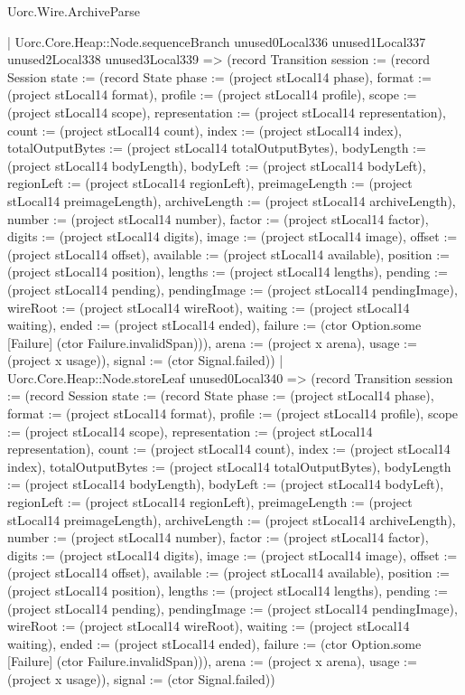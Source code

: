 \begin{lexlean}{Uorc.Wire.ArchiveParse}
\begin{semanticmodule}
{            | Uorc.Core.Heap::Node.sequenceBranch unused0Local336 unused1Local337 unused2Local338 unused3Local339 => (record Transition {session := (record Session {state := (record State {phase := (project stLocal14 phase), format := (project stLocal14 format), profile := (project stLocal14 profile), scope := (project stLocal14 scope), representation := (project stLocal14 representation), count := (project stLocal14 count), index := (project stLocal14 index), totalOutputBytes := (project stLocal14 totalOutputBytes), bodyLength := (project stLocal14 bodyLength), bodyLeft := (project stLocal14 bodyLeft), regionLeft := (project stLocal14 regionLeft), preimageLength := (project stLocal14 preimageLength), archiveLength := (project stLocal14 archiveLength), number := (project stLocal14 number), factor := (project stLocal14 factor), digits := (project stLocal14 digits), image := (project stLocal14 image), offset := (project stLocal14 offset), available := (project stLocal14 available), position := (project stLocal14 position), lengths := (project stLocal14 lengths), pending := (project stLocal14 pending), pendingImage := (project stLocal14 pendingImage), wireRoot := (project stLocal14 wireRoot), waiting := (project stLocal14 waiting), ended := (project stLocal14 ended), failure := (ctor Option.some [Failure] (ctor Failure.invalidSpan))}), arena := (project x arena), usage := (project x usage)}), signal := (ctor Signal.failed)})
            | Uorc.Core.Heap::Node.storeLeaf unused0Local340 => (record Transition {session := (record Session {state := (record State {phase := (project stLocal14 phase), format := (project stLocal14 format), profile := (project stLocal14 profile), scope := (project stLocal14 scope), representation := (project stLocal14 representation), count := (project stLocal14 count), index := (project stLocal14 index), totalOutputBytes := (project stLocal14 totalOutputBytes), bodyLength := (project stLocal14 bodyLength), bodyLeft := (project stLocal14 bodyLeft), regionLeft := (project stLocal14 regionLeft), preimageLength := (project stLocal14 preimageLength), archiveLength := (project stLocal14 archiveLength), number := (project stLocal14 number), factor := (project stLocal14 factor), digits := (project stLocal14 digits), image := (project stLocal14 image), offset := (project stLocal14 offset), available := (project stLocal14 available), position := (project stLocal14 position), lengths := (project stLocal14 lengths), pending := (project stLocal14 pending), pendingImage := (project stLocal14 pendingImage), wireRoot := (project stLocal14 wireRoot), waiting := (project stLocal14 waiting), ended := (project stLocal14 ended), failure := (ctor Option.some [Failure] (ctor Failure.invalidSpan))}), arena := (project x arena), usage := (project x usage)}), signal := (ctor Signal.failed)})
}
\end{semanticmodule}
\end{lexlean}
